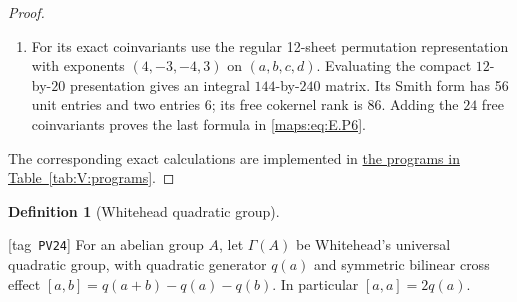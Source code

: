 \documentclass[11pt,a4paper]{article}
\numberwithin{equation}{section}
\theoremstyle{definition}
\newtheorem{definition}[definition]{Definition}
\newcommand{\StatementRecord}[4]{{\upshape\footnotesize[tag~\texttt{#3}]}\enspace\ignorespaces}
\begin{document}
\begin{proof}
\begin{enumerate}[label=\arabic*.,leftmargin=*]
\item For its exact coinvariants use the regular
12-sheet permutation representation with
exponents $(4,-3,-4,3)$ on $(a,b,c,d)$.
Evaluating the compact $12$-by-$20$ presentation gives
an integral $144$-by-$240$ matrix. Its Smith form has
56 unit entries and two entries $6$; its free
cokernel rank is $86$. Adding the $24$ free
coinvariants proves the last formula in \eqref{maps:eq:E.P6}.

\end{enumerate}
The corresponding exact calculations are implemented in \hyperlink{prog:V:quadratic}{the programs in Table~\ref*{tab:V:programs}}.
\end{proof}


\begin{definition}[Whitehead quadratic group]\hypertarget{tag-PV24}{}\label{def:V:whitehead-quadratic}
\StatementRecord{def:V:whitehead-quadratic}{proved}{PV24}{}
For an abelian group $A$, let $\Gamma(A)$ be Whitehead's universal
quadratic group, with quadratic generator $q(a)$ and symmetric
bilinear cross effect
$[a,b]=q(a+b)-q(a)-q(b)$.  In particular $[a,a]=2q(a)$.
\end{definition}
\end{document}

